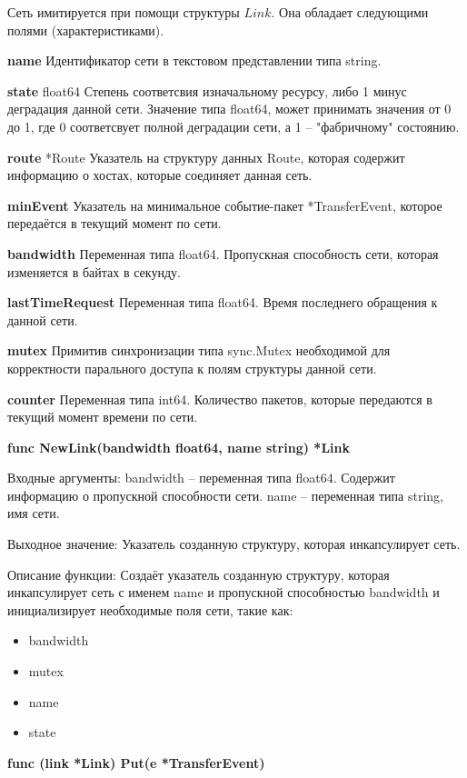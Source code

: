 Сеть имитируется при помощи структуры $Link$. Она обладает следующими полями (характеристиками). 

\textbf{name}
Идентификатор сети в текстовом представлении типа string. 

\textbf{state}	 float64
Степень соответсвия изначальному ресурсу, либо 1 минус деградация данной сети. Значение типа float64, может принимать значения от 0 до 1, где 0 соответсвует полной деградации сети, а 1 -- "фабричному" состоянию. 

\textbf{route}	 *Route
Указатель на структуру данных Route, которая содержит информацию о хостах, которые соединяет данная сеть. 

\textbf{minEvent}	
Указатель на минимальное событие-пакет *TransferEvent, которое передаётся в текущий момент по сети. 

\textbf{bandwidth}	 
Переменная типа float64. Пропускная способность сети, которая изменяется в байтах в секунду. 

\textbf{lastTimeRequest}
Переменная типа float64. Время последнего обращения к данной сети.

\textbf{mutex}	           
Примитив синхронизации типа sync.Mutex необходимой для корректности парального доступа к полям структуры данной сети.
 
\textbf{counter}
Переменная типа int64. Количество пакетов, которые передаются в текущий момент времени по сети. 


\textbf{func NewLink(bandwidth float64, name string) *Link}

Входные аргументы: bandwidth -- переменная типа float64. Содержит информацию о пропускной способности сети. name -- переменная типа string, имя сети. 

Выходное значение: Указатель созданную структуру, которая инкапсулирует сеть. 

Описание функции: Создаёт указатель созданную структуру, которая инкапсулирует сеть с именем name и пропускной способностью bandwidth и инициализирует необходимые поля сети, такие как:

\begin{itemize}
\item bandwidth 
\item mutex    
\item name   
\item state  
\end{itemize}




\textbf{func (link *Link) Put(e *TransferEvent)}

